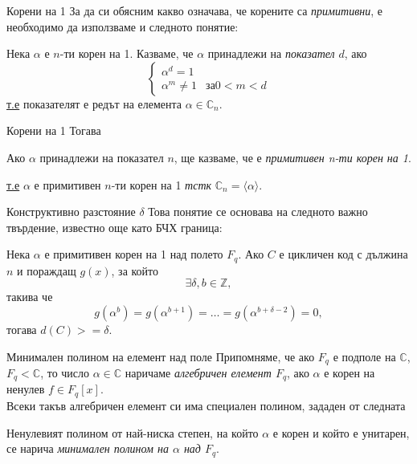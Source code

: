 \documentclass[numbering=fraction]{beamer}
\begin{document}
\begin{frame}{Корени на 1}
За да си обясним какво означава, че корените са \emph{примитивни}, е необходимо
да използваме и следното понятие:
\begin{definition}
\smallskip
Нека $\alpha$ е $n$-ти корен на 1. Казваме, че $\alpha$ принадлежи на
\emph{показател} $d$, ако \[
\begin{cases}
	\alpha^d = 1 \\
	\alpha^m \ne 1 & за 0 < m < d
\end{cases}\]
\bigskip
\underline{т.е} показателят е редът на елемента $\alpha \in \mathbb{C}_n$.
\end{definition}
\end{frame}

\begin{frame}{Корени на 1}
Тогава
\begin{definition}
\smallskip
Ако $\alpha$ принадлежи на показател $n$, ще казваме, че е \emph{примитивен n-ти корен на 1}.
\end{definition}
\smallskip
\underline{т.е} $\alpha$ е примитивен $n$-ти корен на 1 \textit{тстк}
$\mathbb{C}_n = \langle\alpha\rangle$.
\end{frame}

\begin{frame}{Конструктивно разстояние $\delta$}
Това понятие се основава на следното важно твърдение, известно още като БЧХ
граница:
\begin{theorem}
Нека $\alpha$ е примитивен корен на 1 над полето $F_q$. Ако $C$ е цикличен код с
дължина $n$ и пораждащ $g(x)$, за който \[
\exists \delta, b \in \mathbb{Z},
\] такива че \[
g(\alpha^b) = g(\alpha^{b + 1}) = \dots = g(\alpha^{b + \delta - 2}) = 0,
\]
тогава $d(C) >= \delta$.
\end{theorem}
\end{frame}

\begin{frame}{Минимален полином на елемент над поле}
Припомняме, че ако $F_q$ е подполе на $\mathbb{C}$, $F_q < \mathbb{C}$, то число
$\alpha \in \mathbb{C}$ наричаме \emph{алгебричен елемент $F_q$}, ако $\alpha$ е
корен на ненулев $f \in F_q[x]$. \\
\smallskip
Всеки такъв алгебричен елемент си има специален полином, зададен от
следната
\begin{definition}
\smallskip
Ненулевият полином от най-ниска степен, на който $\alpha$ е корен и който е
унитарен\footnotemark, се нарича \emph{минимален полином на $\alpha$ над $F_q$}.
\end{definition}
\end{frame}
\end{document}

